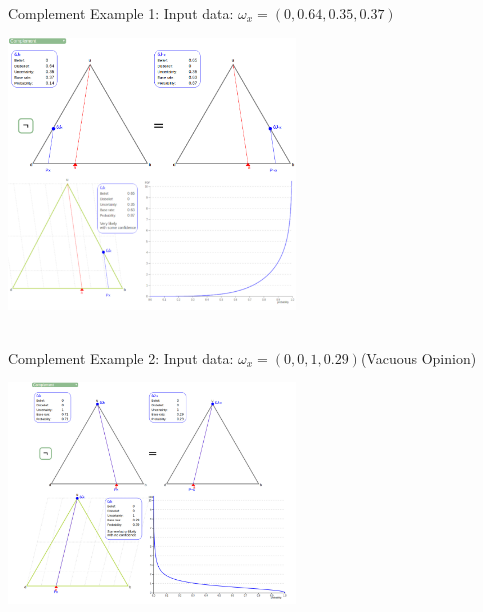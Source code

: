 \documentclass[UTF8]{article}
\newcommand{\opinion}[5]{$\omega_{#1} = (#2, #3, #4, #5)$}
\begin{document}
Complement Example 1:
Input data: 
\opinion{x}{0}{0.64}{0.35}{0.37}
\begin{center}
\includegraphics[width=3in]{images/comp1.png}
\end{center}
\hrulefill\\
Complement Example 2:
Input data: 
\opinion{x}{0}{0}{1}{0.29}(Vacuous Opinion)
\begin{center}
\includegraphics[width=3in]{images/comp2.png}
\end{center}
\end{document}
